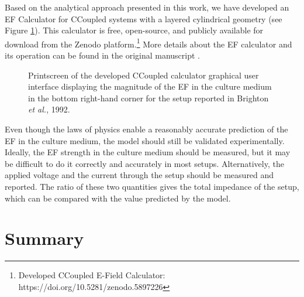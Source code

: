 Based on the analytical approach presented in this work, we have developed an \acs{EF} Calculator for \acs{CCoupled} systems with a layered cylindrical geometry (see Figure \ref{fig5d11}). This calculator is free, open-source, and publicly available for download from the Zenodo platform.\footnote{Developed CCoupled E-Field Calculator: https://doi.org/10.5281/zenodo.5897226} More details about the \acs{EF} calculator and its operation can be found in the original manuscript \cite{Meneses2022-yk}.

\begin{figure}
\caption{Printscreen of the developed \acs{CCoupled} calculator graphical user interface displaying the magnitude of the \acs{EF} in the culture medium in the bottom right-hand corner for the setup reported in Brighton \textit{et al.}, 1992.}
\label{fig5d11}
\end{figure}  

Even though the laws of physics enable a reasonably accurate prediction of the \acs{EF} in the culture medium, the model should still be validated experimentally. Ideally, the \acs{EF} strength in the culture medium should be measured, but it may be difficult to do it correctly and accurately in most setups. Alternatively, the applied voltage and the current through the setup should be measured and reported. The ratio of these two quantities gives the total impedance of the setup, which can be compared with the value predicted by the model.

 

\section{Summary}


